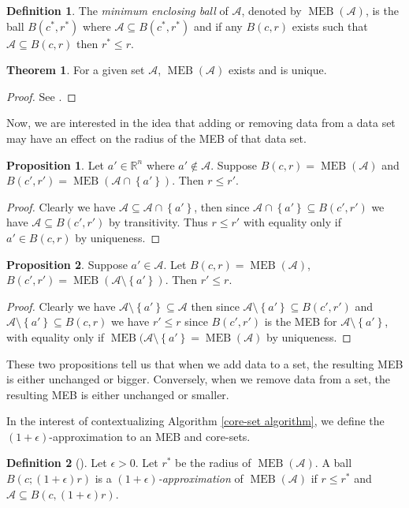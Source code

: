 \documentclass[11pt,twoside]{report}
\newcommand{\A}{\mathcal{A}} %
\DeclareMathOperator{\MEB}{MEB}
\theoremstyle{definition}
\newtheorem{definition}{Definition}
\newtheorem{theorem}{Theorem}
\newtheorem{proposition}{Proposition}
\numberwithin{theorem}{section}
\numberwithin{definition}{section}
\numberwithin{lemma}{section}
\numberwithin{proposition}{section}
\numberwithin{equation}{section}
\numberwithin{figure}{section}
\begin{document}
\begin{definition}
    The \textit{minimum enclosing ball} of $\A$, denoted by $\MEB(\A)$, is the ball $B(c^*,r^*)$ where $\A\subseteq B(c^*,r^*)$ and if any $B(c,r)$ exists such that $\mathcal{A}\subseteq B(c,r)$ then $r^*\leq r$.
\end{definition}

\begin{theorem}\label{thm:unique}
    For a given set $\A$, $\MEB(\A)$ exists and is unique.
\end{theorem}
\begin{proof}
    See \cite[page 5]{two-algorithms}.
\end{proof}

Now, we are interested in the idea that adding or removing data from a data set may have an effect on the radius of the MEB of that data set.
\begin{proposition}\label{adding data}
    Let $a'\in\mathbb{R}^n$ where $a'\notin\A$. Suppose $B(c,r)=\MEB(\A)$ and $B(c',r')=\MEB(\A\cap\left\{a'\right\})$. Then $r\leq r'$.
\end{proposition}
\begin{proof}
    Clearly we have $\A\subseteq\A\cap\left\{a'\right\}$, then since $\A\cap\left\{a'\right\}\subseteq B(c',r')$ we have $\mathcal{A}\subseteq B(c',r')$ by transitivity. Thus $r\leq r'$ with equality only if $a'\in B(c,r)$ by uniqueness.
\end{proof}

\begin{proposition}\label{removing data}
    Suppose $a'\in\A$. Let $B(c,r)=\MEB(\A)$, $B(c',r')=\MEB(\A\setminus\left\{a'\right\})$. Then $r'\leq r$.
\end{proposition}
\begin{proof}
    Clearly we have $\A\setminus\left\{a'\right\}\subseteq\A$ then since $\A\setminus\left\{a'\right\}\subseteq B(c',r')$ and $\A\setminus\left\{a'\right\}\subseteq B(c,r)$ we have $r'\leq r$ since $B(c',r')$ is the MEB for $\A\setminus\left\{a'\right\}$, with equality only if $\MEB(\A\setminus\left\{a'\right\} = \MEB(\A)$ by uniqueness.
\end{proof}
These two propositions tell us that when we add data to a set, the resulting MEB is either unchanged or bigger. Conversely, when we remove data from a set, the resulting MEB is either unchanged or smaller.

In the interest of contextualizing Algorithm \ref{core-set algorithm}, we define the $(1+\epsilon)$-approximation to an MEB and core-sets.
\begin{definition}[{{\cite[page 2]{core-sets}}}]
    Let $\epsilon>0$. Let $r^*$ be the radius of $\MEB(\A)$. A ball $B(c;(1+\epsilon)r)$ is a \textit{$(1+\epsilon)$-approximation} of $\MEB(\A)$ if $r\leq r^*$ and $\mathcal{A}\subseteq B(c,(1+\epsilon)r)$.
\end{definition}
\end{document}
